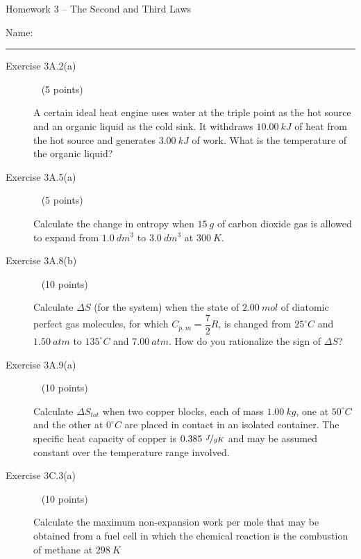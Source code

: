 \documentclass[12pt, openany, letterpaper]{memoir}
\begin{document}
\begin{center}
	{\large Homework 3 -- The Second and Third Laws}
\end{center}

Name: \rule[-.1mm]{15em}{0.1pt}

\begin{description}	
	\item [Exercise 3A.2(a)] ~ (5 points)
	
	A certain ideal heat engine uses water at the triple point as the hot source and an organic liquid as the cold sink. It withdraws $10.00~kJ$ of heat from the hot source and generates $3.00~kJ$ of work. What is the temperature of the organic liquid?
	
	\vspace{15em}
	\item [Exercise 3A.5(a)] ~ (5 points)
	
	Calculate the change in entropy when $15~g$ of carbon dioxide gas is allowed to expand from $1.0~dm^3$ to $3.0~dm^3$ at $300~K$.
	
	\vspace{15em}\newpage
	\item [Exercise 3A.8(b)] ~ (10 points)
	
	Calculate $\Delta S$ (for the system) when the state of $2.00~mol$ of diatomic perfect gas molecules, for which $C_{p,m}=\dfrac{7}{2}R$, is changed from $25^\circ C$ and $1.50~atm$ to $135^\circ C$ and $7.00~atm$. How do you rationalize the sign of $\Delta S$?
	
	\vspace{21em}

	\item [Exercise 3A.9(a)] ~ (10 points)
	
	Calculate $\Delta S_{tot}$ when two copper blocks, each of mass $1.00~kg$, one at $50^\circ C$ and the other at $0^\circ C$ are placed in contact in an isolated container. The specific heat capacity of copper is $0.385~\nicefrac{J}{gK}$ and may be assumed constant over the temperature range involved.
	
	\vspace{21em}
	
	\item [Exercise 3C.3(a)] ~ (10 points)
	
	Calculate the maximum non-expansion work per mole that may be obtained from a fuel cell in which the chemical reaction is the combustion of methane at $298~K$

	\vspace{20em}
	

\end{description}
\end{document}
